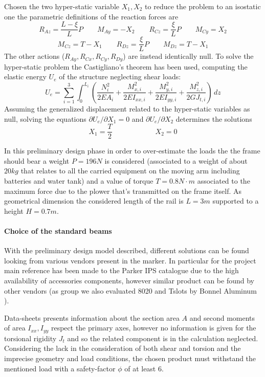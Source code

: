 	Chosen the two hyper-static variable $X_1,X_2$ to reduce the problem to an isostatic one the parametric definitions of the reaction forces are
	\[ R_{Az} = \frac {L-\xi}L P \qquad M_{Ay} = -X_2 \qquad R_{Cz} = \frac \xi L P \qquad M_{Cy} = X_2 \] \[ M_{Cz} = T - X_1 \qquad R_{Dz} = \frac \xi L P \qquad M_{Dz} = T - X_1 \]
	The other actions ($R_{Ay},R_{Cx}, R_{Cy}, R_{Dy}$) are instead identically null. To solve the hyper-static problem the Castigliano's theorem has been used, computing the elastic energy $U_e$ of the structure neglecting shear loads:
	\[ U_e = \sum_{i=1}^3 \int_0 ^{L_i}  \left( \frac{N_i^2}{2EA_i} + \frac{M_{x,i}^2}{2 EI_{xx,i}} + \frac{M_{y,i}^2}{2 E I_{yy,i}} + \frac{M_{z,i}^2}{2G J_{t,i}}  \right)\, dz \]
	Assuming the generalized displacement related to the hyper-static variables as null, solving the equations $\partial U_e / \partial X_1 = 0$ and $\partial U_e/\partial X_2$ determines the solutions
	\[ X_1 = \frac T 2 \qquad \qquad \qquad X_2 = 0 \]
	
	
	In this preliminary design phase in order to over-estimate the loads the the frame should bear a weight $P = 196 N$ is considered (associated to a weight of about $20kg$ that relates to all the carried equipment on the moving arm including batteries and water tank) and a value of torque $T = 0.8 N\cdot m$ associated to the maximum force due to the plower that's transmitted on the frame itself. As geometrical dimension the considered length of the rail is $L=3m$ supported to a height $H = 0.7m$.
	
	\paragraph{Choice of the standard beams} With the preliminary design model described, different solutions can be found looking from various vendors present in the marker. In particular for the project main reference has been made to the Parker IPS catalogue \cite{parker-ds} due to the high availability of accessories components, however similar product can be found by other vendors (as group we also evaluated 8020 \cite{8020-ds} and Tslots by Bonnel Aluminum \cite{tslot-ds}).
	
	Data-sheets presents information about the section area $A$ and second moments of area $I_{xx},I_{yy}$ respect the primary axes, however no information is given for the torsional rigidity $J_t$ and so the related component is in the calculation neglected. Considering the lack in the consideration of both shear and torsion and the imprecise geometry and load conditions, the chosen product must withstand the mentioned load with a safety-factor $\phi$ of at least 6.
	
